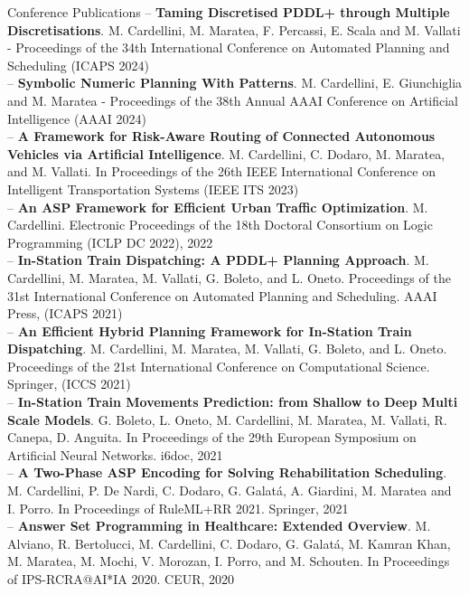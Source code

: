 \documentclass{resume} %
\begin{document}
\begin{rSection}{Conference Publications}
-- \textbf{Taming Discretised PDDL+ through Multiple Discretisations}. M. Cardellini, M. Maratea, F. Percassi, E. Scala and M. Vallati - Proceedings of the 34th International Conference on Automated Planning and Scheduling (ICAPS 2024)\\
-- \textbf{Symbolic Numeric Planning With Patterns}. M. Cardellini, E. Giunchiglia and M. Maratea - Proceedings of the 38th Annual AAAI Conference on Artificial Intelligence (AAAI 2024) \\
-- \textbf{A Framework for Risk-Aware Routing of Connected Autonomous Vehicles via Artificial Intelligence}. M. Cardellini, C. Dodaro, M. Maratea, and M. Vallati. In Proceedings of the 26th IEEE International Conference on Intelligent Transportation Systems (IEEE ITS 2023) \\
-- \textbf{An ASP Framework for Efficient Urban Traffic Optimization}. M. Cardellini. Electronic Proceedings of the 18th Doctoral Consortium on Logic Programming (ICLP DC 2022), 2022 \\
-- \textbf{In-Station Train Dispatching: A PDDL+ Planning Approach}. M. Cardellini, M. Maratea, M. Vallati, G. Boleto, and L. Oneto. Proceedings of the 31st International Conference on Automated Planning and Scheduling. AAAI Press, (ICAPS 2021) \\
-- \textbf{An Efficient Hybrid Planning Framework for In-Station Train Dispatching}. M. Cardellini, M. Maratea, M. Vallati, G. Boleto, and L. Oneto. Proceedings of the 21st International Conference on Computational Science. Springer, (ICCS 2021) \\
-- \textbf{In-Station Train Movements Prediction: from Shallow to Deep Multi Scale Models}. G. Boleto, L. Oneto, M. Cardellini, M. Maratea, M. Vallati, R. Canepa, D. Anguita. In Proceedings of the 29th European Symposium on Artificial Neural Networks. i6doc, 2021\\
-- \textbf{A Two-Phase ASP Encoding for Solving Rehabilitation Scheduling}. M. Cardellini, P. De Nardi, C. Dodaro, G. Galat\'a, A. Giardini, M. Maratea and I. Porro. In Proceedings of RuleML+RR 2021. Springer, 2021\\
-- \textbf{Answer Set Programming in Healthcare: Extended Overview}. M. Alviano, R. Bertolucci, M. Cardellini, C. Dodaro, G. Galat\'a, M. Kamran Khan, M. Maratea, M. Mochi, V. Morozan, I. Porro, and M. Schouten. In Proceedings of IPS-RCRA@AI*IA 2020. CEUR, 2020
\end{rSection}
\end{document}
